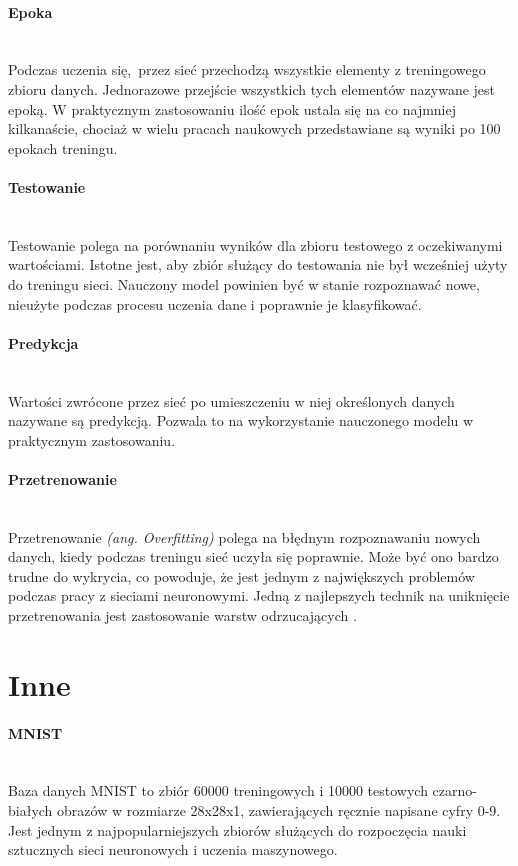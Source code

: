 \paragraph{Epoka} \mbox{}\\
Podczas uczenia się, przez sieć przechodzą wszystkie elementy z treningowego zbioru danych.
Jednorazowe przejście wszystkich tych elementów nazywane jest epoką. W praktycznym zastosowaniu
ilość epok ustala się na co najmniej kilkanaście, chociaż w wielu pracach naukowych przedstawiane
są wyniki po 100 epokach treningu.

\paragraph{Testowanie} \mbox{}\\
Testowanie polega na porównaniu wyników dla zbioru testowego z oczekiwanymi wartościami.
Istotne jest, aby zbiór służący do testowania nie był wcześniej użyty do treningu sieci.
Nauczony model powinien być w stanie rozpoznawać nowe, nieużyte podczas procesu uczenia
dane i poprawnie je klasyfikować.

\paragraph{Predykcja} \mbox{}\\
Wartości zwrócone przez sieć po umieszczeniu w niej określonych danych nazywane są
predykcją. Pozwala to na wykorzystanie nauczonego modelu w praktycznym zastosowaniu.

\paragraph{Przetrenowanie} \mbox{}\\
Przetrenowanie \textit{(ang. Overfitting)} polega na błędnym rozpoznawaniu nowych danych,
kiedy podczas treningu sieć uczyła się poprawnie. Może być ono bardzo trudne do wykrycia,
co powoduje, że jest jednym z największych problemów podczas pracy z sieciami neuronowymi.
Jedną z najlepszych technik na uniknięcie przetrenowania jest zastosowanie warstw
odrzucających \cite{DropoutPreventOverfit}.

\section{Inne}

\paragraph{MNIST} \mbox{}\\
Baza danych MNIST \cite{MNIST} to zbiór 60000 treningowych i 10000 testowych czarno-białych obrazów
w rozmiarze 28x28x1, zawierających ręcznie napisane cyfry 0-9. Jest jednym z
najpopularniejszych zbiorów służących do rozpoczęcia nauki sztucznych sieci neuronowych
i uczenia maszynowego.

